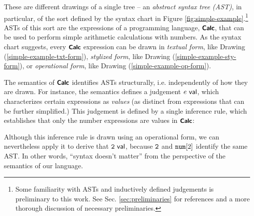 \noindent
These are different drawings of a single tree -- an \emph{abstract syntax tree (AST)}, in particular, of the sort defined by the syntax chart in Figure \ref{fig:simple-example}.\footnote{Some familiarity with ASTs and inductively defined judgements is preliminary to this work. See Sec. \ref{sec:preliminaries} for references and a more thorough discussion of necessary preliminaries.} ASTs of this sort are the expressions of a programming language, $\simplelang$, that can be used to perform simple arithmetic calculations with numbers. 
As the syntax chart suggests, every $\simplelang$ expression can be drawn in \emph{textual form}, like Drawing (\ref{simple-example-txt-form}), \emph{stylized form}, like Drawing (\ref{simple-example-sty-form}), or \emph{operational form}, like Drawing (\ref{simple-example-op-form}).





 The semantics of $\simplelang$ identifies ASTs {structurally}, i.e. independently of how they are drawn. For instance, the semantics defines a judgement $\isvalU{e}$, which characterizes certain expressions as \emph{values} (as distinct from  expressions that can be further simplified.) This judgement is defined by a single inference rule, which establishes that only the number expressions are values in $\simplelang$:
\begin{mathpar}
\end{mathpar}
Although this inference rule is drawn using an operational form, we can nevertheless apply it to derive that $\isvalU{\numintro{2}}$, because $\numintro{2}$ and $\anumintro{2}$ identify the same AST. In other words, ``syntax doesn't matter'' from the perspective of the semantics of our language.


